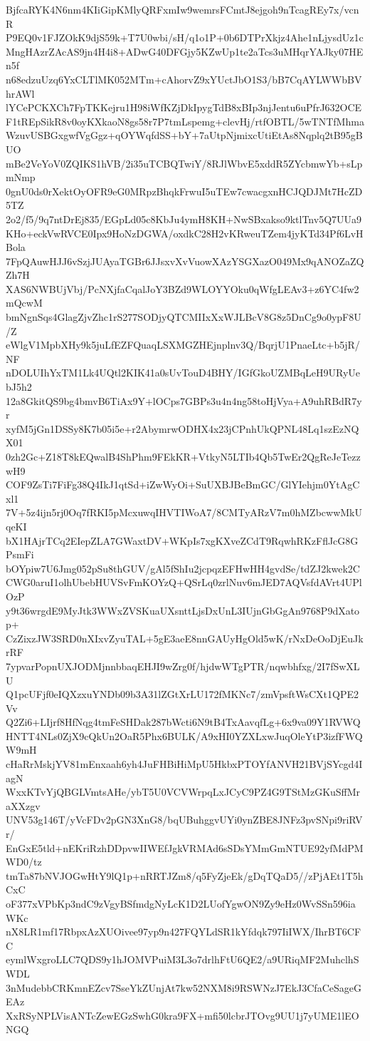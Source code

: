 BjfcaRYK4N6nm4KIiGipKMlyQRFxmIw9wemrsFCmtJ8ejgoh9nTcagREy7x/vcnR
P9EQ0v1FJZOkK9djS59k+T7U0wbi/sH/q1o1P+0b6DTPrXkjz4Ahe1nLjysdUz1c
MngHAzrZAcAS9jn4H4i8+ADwG40DFGjy5KZwUp1te2aTcs3uMHqrYAJky07HEn5f
n68edzuUzq6YxCLTlMK052MTm+cAhorvZ9xYUctJbO1S3/bB7CqAYLWWbBVhrAWl
lYCePCKXCh7FpTKKejru1H98iWfKZjDkIpygTdB8xBIp3njJentu6uPfrJ632OCE
F1tREpSikR8v0oyKXkaoN8gs58r7P7tmLspemg+clevHj/rtfOBTL/5wTNTfMhma
WzuvUSBGxgwfVgGgz+qOYWqfdSS+bY+7aUtpNjmixcUtiEtAs8Nqplq2tB95gBUO
mBe2VeYoV0ZQIKS1hVB/2i35uTCBQTwiY/8RJlWbvE5xddR5ZYcbmwYb+sLpmNmp
0gnU0ds0rXektOyOFR9eG0MRpzBhqkFrwuI5uTEw7cwacgxnHCJQDJMt7HcZD5TZ
2o2/f5/9q7ntDrEj835/EGpLd05c8KbJu4ymH8KH+NwSBxakso9ktlTnv5Q7UUa9
KHo+eckVwRVCE0Ipx9HoNzDGWA/oxdkC28H2vKRweuTZem4jyKTd34Pf6LvHBola
7FpQAuwHJJ6vSzjJUAyaTGBr6JJsxvXvVuowXAzYSGXazO049Mx9qANOZaZQZh7H
XAS6NWBUjVbj/PcNXjfaCqalJoY3BZd9WLOYYOku0qWfgLEAv3+z6YC4fw2mQcwM
bmNgnSqs4GlagZjvZhc1rS277SODjyQTCMIIxXxWJLBcV8G8z5DnCg9o0ypF8U/Z
eWlgV1MpbXHy9k5juLfEZFQuaqLSXMGZHEjnplnv3Q/BqrjU1PnaeLtc+b5jR/NF
nDOLUIhYxTM1Lk4UQtl2KIK41a0sUvTouD4BHY/IGfGkoUZMBqLeH9URyUebJ5h2
12a8GkitQS9bg4bmvB6TiAx9Y+lOCps7GBPs3u4n4ng58toHjVya+A9uhRBdR7yr
xyfM5jGn1DSSy8K7b05i5e+r2AbymrwODHX4x23jCPnhUkQPNL48Lq1szEzNQX01
0zh2Gc+Z18T8kEQwalB4ShPhm9FEkKR+VtkyN5LTIb4Qb5TwEr2QgReJeTezzwH9
COF9ZsTi7FiFg38Q4IkJ1qtSd+iZwWyOi+SuUXBJBeBmGC/GlYIehjm0YtAgCxl1
7V+5z4ijn5rj0Oq7fRKI5pMcxuwqIHVTIWoA7/8CMTyARzV7m0hMZbcwwMkUqeKI
bX1HAjrTCq2EIepZLA7GWaxtDV+WKpIs7xgKXveZCdT9RqwhRKzFflJcG8GPsmFi
bOYpiw7U6Jmg052pSu8thGUV/gAl5fShIu2jcpqzEFHwHH4gvdSe/tdZJ2kwek2C
CWG0aruI1olhUbebHUVSvFmKOYzQ+QSrLq0zrlNuv6mJED7AQVsfdAVrt4UPlOzP
y9t36wrgdE9MyJtk3WWxZVSKuaUXsnttLjsDxUnL3IUjnGbGgAn9768P9dXatop+
CzZixzJW3SRD0nXIxvZyuTAL+5gE3aeE8nnGAUyHgOld5wK/rNxDeOoDjEuJkrRF
7ypvarPopnUXJODMjnnbbaqEHJI9wZrg0f/hjdwWTgPTR/nqwbhfxg/2I7fSwXLU
Q1pcUFjf0eIQXzxuYNDb09b3A31lZGtXrLU172fMKNc7/zmVpsftWsCXt1QPE2Vv
Q2Zi6+LIjrf8HfNqg4tmFeSHDak287bWcti6N9tB4TxAavqfLg+6x9va09Y1RVWQ
HNTT4NLs0ZjX9cQkUn2OaR5Phx6BULK/A9xHI0YZXLxwJuqOleYtP3izfFWQW9mH
cHaRrMskjYV81mEnxaah6yh4JuFHBiHiMpU5HkbxPTOYfANVH21BVjSYcgd4IagN
WxxKTvYjQBGLVmtsAHe/ybT5U0VCVWrpqLxJCyC9PZ4G9TStMzGKuSffMraXXzgv
UNV53g146T/yVcFDv2pGN3XnG8/bqUBuhggvUYi0ynZBE8JNFz3pvSNpi9riRVr/
EnGxE5tld+nEKriRzhDDpvwIIWEfJgkVRMAd6sSDsYMmGmNTUE92yfMdPMWD0/tz
tmTa87bNVJOGwHtY9lQ1p+nRRTJZm8/q5FyZjeEk/gDqTQaD5//zPjAEt1T5hCxC
oF377xVPbKp3ndC9zVgyBSfmdgNyLcK1D2LUofYgwON9Zy9eHz0WvSSn596iaWKc
nX8LR1mf17RbpxAzXUOivee97yp9n427FQYLdSR1kYfdqk797IiIWX/IhrBT6CFC
eymlWxgroLLC7QDS9y1hJOMVPuiM3L3o7drlhFtU6QE2/a9URiqMF2MuhclhSWDL
3nMudebbCRKmnEZcv7SseYkZUnjAt7kw52NXM8i9RSWNzJ7EkJ3CfaCeSageGEAz
XxRSyNPLVisANTcZewEGzSwhG0kra9FX+mfi50lcbrJTOvg9UU1j7yUME1lEONGQ
